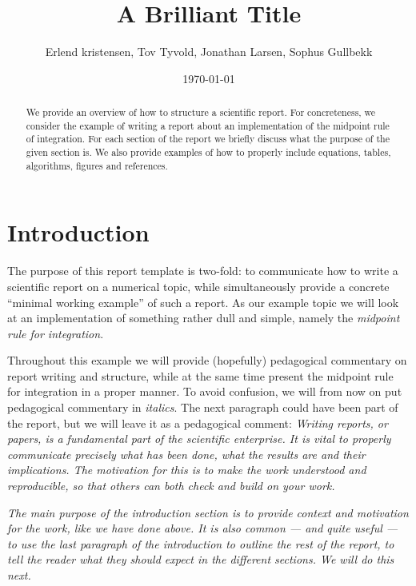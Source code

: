 \documentclass[english,notitlepage,reprint,nofootinbib]{revtex4-1}  %
\begin{document}
\title{A Brilliant Title}  %
\author{Erlend kristensen, Tov Tyvold, Jonathan Larsen, Sophus Gullbekk} %
\date{\today}                             %
\noaffiliation                            %

\begin{abstract}
    We provide an overview of how to structure a scientific report. For concreteness, we consider the example of writing a report about an implementation of the midpoint rule of integration. For each section of the report we briefly discuss what the purpose of the given section is. We also provide examples of how to properly include equations, tables, algorithms, figures and references.
\end{abstract}
\maketitle


\section{Introduction}
%
The purpose of this report template is two-fold: to communicate how to write a scientific report on a numerical topic, while simultaneously provide a concrete ``minimal working example'' of such a report. As our example topic we will look at an implementation of something rather dull and simple, namely the \textit{midpoint rule for integration}.

Throughout this example we will provide (hopefully) pedagogical commentary on report writing and structure, while at the same time present the midpoint rule for integration in a proper manner. To avoid confusion, we will from now on put pedagogical commentary in \textit{italics}. The next paragraph could have been part of the report, but we will leave it as a pedagogical comment: \textit{Writing reports, or papers, is a fundamental part of the scientific enterprise. It is vital to properly communicate precisely what has been done, what the results are and their implications. The motivation for this is to make the work understood and reproducible, so that others can both check and build on your work.}

\textit{The main purpose of the introduction section is to provide context and motivation for the work, like we have done above. It is also common --- and quite useful --- to use the last paragraph of the introduction to outline the rest of the report, to tell the reader what they should expect in the different sections. We will do this next.}
\end{document}
